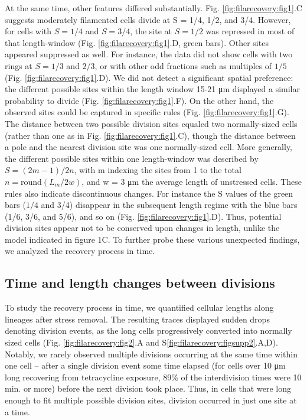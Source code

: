 At the same time, other features differed substantially. Fig. \ref{fig:filarecovery:fig1}.C suggests moderately filamented cells divide at S = 1/4,  1/2, and 3/4. However, for cells with $S = 1/4$ and $S = 3/4$, the site at $S = 1/2$ was repressed in most of that length-window (Fig. \ref{fig:filarecovery:fig1}.D, green bars). Other sites appeared suppressed as well. For instance, the data did not show cells with two rings at $S = 1/3$ and $2/3$, or with other odd fractions such as multiples of $1/5$ (Fig. \ref{fig:filarecovery:fig1}.D). We did not detect a significant spatial preference: the different possible sites within the length window 15-21 μm displayed a similar probability to divide (Fig. \ref{fig:filarecovery:fig1}.F). On the other hand, the observed sites could be captured in specific rules (Fig. \ref{fig:filarecovery:fig1}.G). The distance between two possible division sites equaled two normally-sized cells (rather than one as in Fig. \ref{fig:filarecovery:fig1}.C), though the distance between a pole and the nearest division site was one normally-sized cell. More generally, the different possible sites within one length-window was described by $S = (2m-1)/2n$, with m indexing the sites from 1 to the total $n = \text{round}(L_m/2w)$, and w = 3 μm the average length of unstressed cells. These rules also indicate discontinuous changes. 
For instance the S values of the green bars ($1/4$ and 3/4) disappear in the subsequent length regime with the blue bars (1/6, 3/6, and 5/6), and so on (Fig. \ref{fig:filarecovery:fig1}.D). Thus, potential division sites appear not to be conserved upon changes in length, unlike the model indicated in figure 1C. To further probe these various unexpected findings, we analyzed the recovery process in time. 

\subsection{Time and length changes between divisions}
To study the recovery process in time, we quantified cellular lengths along lineages after stress removal. The resulting traces displayed sudden drops denoting division events, as the long cells progressively converted into normally sized cells (Fig. \ref{fig:filarecovery:fig2}.A and S\ref{fig:filarecovery:figsupp2}.A,D). Notably, we rarely observed multiple divisions occurring at the same time within one cell – after a single division event some time elapsed (for cells over 10 μm long recovering from tetracycline exposure, 89\% of the interdivision times were 10 min. or more) before the next division took place.  Thus, in cells that were long enough to fit multiple possible division sites, division occurred in just one site at a time.

